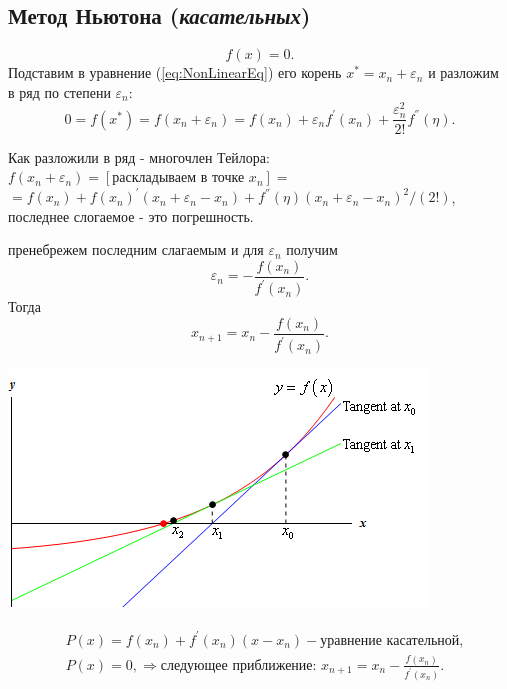 \documentclass[a4paper,11pt]{article}
\begin{document}
\subsection{Метод Ньютона (\textit{касательных})}
\begin{equation}
  f(x) = 0.
  \label{eq:NonlinearEq}
\end{equation}
Подставим в уравнение (\ref{eq:NonLinearEq}) его корень $x^*=x_n+\varepsilon_n$ и разложим \\ в ряд по степени $\varepsilon_n$:
\begin{equation}
  0 = f(x^*) = f(x_n+\varepsilon_n) = f(x_n)+\varepsilon_nf^{'}(x_n)+\frac{\varepsilon_n^2}{2!}f^{''}(\eta).
\end{equation}
\begin{flushright}
  \small
  Как разложили в ряд - многочлен Тейлора: \\
  $f(x_n+\varepsilon_n) = [\text{раскладываем в точке $x_n$}] =$ \\
  $= f(x_n) + f(x_n)^{'}(x_n+\varepsilon_n-x_n) + f^{''}(\eta)(x_n+\varepsilon_n-x_n)^2/(2!)$, \\
  последнее слогаемое - это погрешность.
\end{flushright}
пренебрежем последним слагаемым и для $\varepsilon_n$ получим
\begin{equation*}
  \varepsilon_n = - \frac{f(x_n)}{f^{'}(x_n)}.
\end{equation*}
Тогда
\begin{equation}
  x_{n+1} = x_n - \frac{f(x_n)}{f^{'}(x_n)}.
\end{equation}

\begin{center}
  \includegraphics[scale=0.8]{img1.png}
\end{center}

\begin{align*}
  &P(x) = f(x_n) + f^{'}(x_n)(x-x_n) - \text{уравнение касательной}, \\
  &P(x) = 0, \Rightarrow \text{следующее приближение: } x_{n+1} = x_n - \frac{f(x_n)}{f^{'}(x_n)}.
\end{align*}
\end{document}
